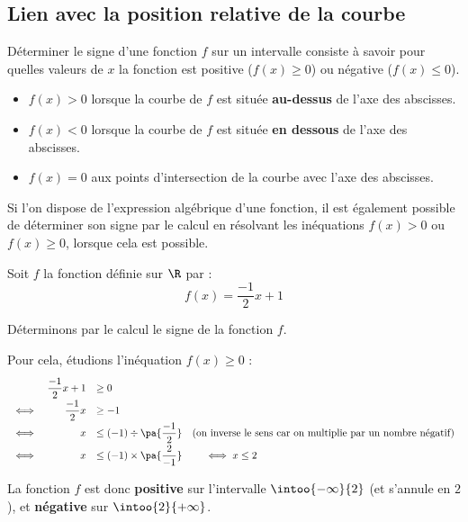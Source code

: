 \subsection{Lien avec la position relative de la courbe}

\begin{prop}
	Déterminer le signe d'une fonction $f$ sur un intervalle consiste à savoir pour quelles valeurs de $x$ la fonction est positive ($f(x) \geqslant 0$) ou négative ($f(x) \leqslant 0$).

	\begin{itemize}
		\item $f(x) > 0$ lorsque la courbe de $f$ est située \textbf{au-dessus} de l'axe des abscisses.
		\item $f(x) < 0$ lorsque la courbe de $f$ est située \textbf{en dessous} de l'axe des abscisses.
		\item $f(x) = 0$ aux points d'intersection de la courbe avec l'axe des abscisses.
	\end{itemize}
\end{prop}

\begin{rem}
	Si l'on dispose de l'expression algébrique d'une fonction, il est également possible de déterminer son signe par le calcul en résolvant les inéquations $f(x) > 0$ ou $f(x) \ge 0$, lorsque cela est possible.
\end{rem}

\begin{ex}
	Soit $f$ la fonction définie sur $\R$ par :
	\[
		f(x) = \dfrac{-1}{2}x + 1
	\]

	Déterminons par le calcul le signe de la fonction $f$.

	Pour cela, étudions l'inéquation $f(x) \ge 0$ :
	\[
		\def\arraystretch{1.8}
		\begin{array}{rrl}
			     & \dfrac{-1}{2}x + 1 & \ge 0                                                                                                     \\
			\iff & \dfrac{-1}{2}x     & \ge -1                                                                                                    \\
			\iff & x                  & \le (-1) \div \pa{\dfrac{-1}{2}} \quad \text{(on inverse le sens car on multiplie par un nombre négatif)} \\
			\iff & x                  & \le (-1) \times \pa{\dfrac{2}{-1}} \qquad\iff x \le 2
		\end{array}
	\]

	La fonction $f$ est donc \textbf{positive} sur l'intervalle $\intoo{-\infty}{2}$ (et s'annule en $2$), et \textbf{négative} sur $\intoo{2}{+\infty}$.
\end{ex}

